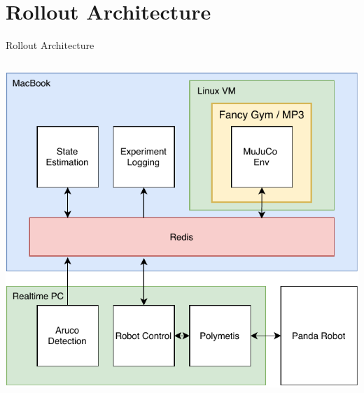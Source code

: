 \documentclass[16:9,en,navbarinfooter]{sdqbeamer}
\begin{document}
\section{Rollout Architecture}
\begin{frame}{Rollout Architecture}
    \begin{columns}
    \begin{column}{0.45\textwidth}
    \vspace{1cm}
\includegraphics[width=\linewidth]{media/Architecture2.pdf}


\end{column}
\end{columns}
\end{frame}
\end{document}
